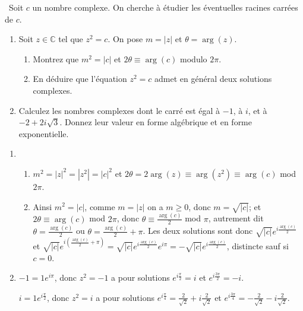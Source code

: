 \documentclass[a4paper,12pt]{exam}
\begin{document}
\begin{questions}
\question\ 
Soit $c$ un nombre complexe. On cherche à étudier les éventuelles racines carrées de $c$.
\begin{enumerate}
 \item Soit $z\in\mathbb C$ tel que $z^2=c$. On pose $m=|z|$ et $\theta=\arg(z)$.
 \begin{enumerate}
 \item Montrez que $m^2=|c|$ et $2\theta\equiv\arg(c)$ modulo $2\pi$.
 \item En déduire que l'équation $z^2=c$ admet en général deux solutions complexes.
 \end{enumerate}
 \item Calculez les nombres complexes dont le carré est égal à $-1$, à $i$, et à $-2+2i\sqrt{3}$. Donnez leur valeur en forme algébrique et en forme exponentielle. 
\end{enumerate}
 \begin{solution}
\begin{enumerate}
 \item\ 
\begin{enumerate}
  \item $m^2=|z|^2=|z^2|=|c|^2$ et $2\theta=2\arg(z)\equiv \arg(z^2)\equiv\arg(c)$ mod $2\pi$.
  \item Ainsi $m^2=|c|$, comme $m=|z|$ on a $m\geqslant0$, donc $m=\sqrt{|c|}$; et $2\theta\equiv\arg(c)$ mod $2\pi$, donc $\theta\equiv\tfrac{\arg(c)}2$ mod $\pi$, autrement dit $\theta=\tfrac{\arg(c)}2$ ou $\theta=\tfrac{\arg(c)}2+\pi$. Les deux solutions sont donc $\sqrt{|c|}e^{i\frac{\arg(c)}2}$ et $\sqrt{|c|}e^{i(\frac{\arg(c)}2+\pi)}=\sqrt{|c|}e^{i\frac{\arg(c)}2}e^{i\pi}=-\sqrt{|c|}e^{i\frac{\arg(c)}2}$, distincte sauf si $c=0$.
\end{enumerate}
\item $-1=1e^{i\pi}$, donc $z^2=-1$ a pour solutions $e^{i\frac\pi2}=i$ et $e^{i\frac{3\pi}2}=-i$.

$i=1e^{i\frac\pi2}$, donc $z^2=i$ a pour solutions $e^{i\frac\pi4}=\tfrac2{\sqrt{2}}+i\tfrac2{\sqrt{2}}$ et $e^{i\frac{3\pi}4}=-\tfrac2{\sqrt{2}}-i\tfrac2{\sqrt{2}}$.


\end{enumerate}
\end{solution}
\end{questions}
\end{document}
